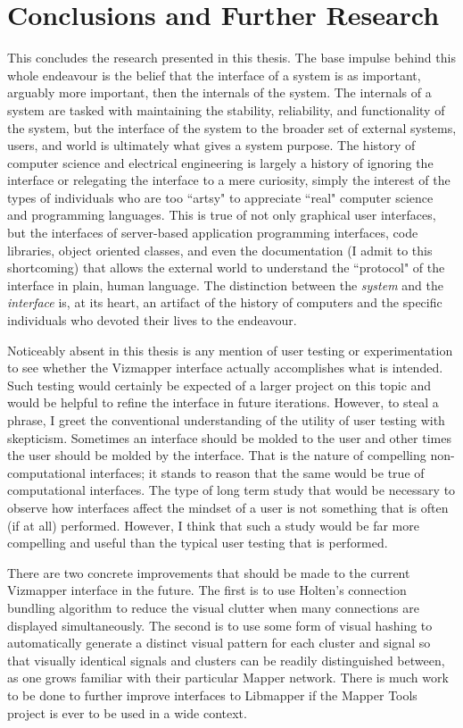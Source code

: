 \resetdatestamp

\chapter{Conclusions and Further Research}

This concludes the research presented in this thesis. The base impulse behind this whole endeavour is the belief that the interface of a system is as important, arguably more important, then the internals of the system. The internals of a system are tasked with maintaining the stability, reliability, and functionality of the system, but the interface of the system to the broader set of external systems, users, and world is ultimately what gives a system purpose. The history of computer science and electrical engineering is largely a history of ignoring the interface or relegating the interface to a mere curiosity, simply the interest of the types of individuals who are too ``artsy" to appreciate ``real" computer science and programming languages. This is true of not only graphical user interfaces, but the interfaces of server-based application programming interfaces, code libraries, object oriented classes, and even the documentation (I admit to this shortcoming) that allows the external world to understand the ``protocol" of the interface in plain, human language. The distinction between the \emph{system} and the \emph{interface} is, at its heart, an artifact of the history of computers and the specific individuals who devoted their lives to the endeavour.

Noticeably absent in this thesis is any mention of user testing or experimentation to see whether the Vizmapper interface actually accomplishes what is intended. Such testing would certainly be expected of a larger project on this topic and would be helpful to refine the interface in future iterations. However, to steal a phrase, I greet the conventional understanding of the utility of user testing with skepticism. Sometimes an interface should be molded to the user and other times the user should be molded by the interface. That is the nature of compelling non-computational interfaces; it stands to reason that the same would be true of computational interfaces. The type of long term study that would be necessary to observe how interfaces affect the mindset of a user is not something that is often (if at all) performed. However, I think that such a study would be far more compelling and useful than the typical user testing that is performed.

There are two concrete improvements that should be made to the current Vizmapper interface in the future. The first is to use Holten's connection bundling algorithm \cite{edgebundles2006} to reduce the visual clutter when many connections are displayed simultaneously. The second is to use some form of visual hashing to automatically generate a distinct visual pattern for each cluster and signal so that visually identical signals and clusters can be readily distinguished between, as one grows familiar with their particular Mapper network. There is much work to be done to further improve interfaces to Libmapper if the Mapper Tools project is ever to be used in a wide context.
